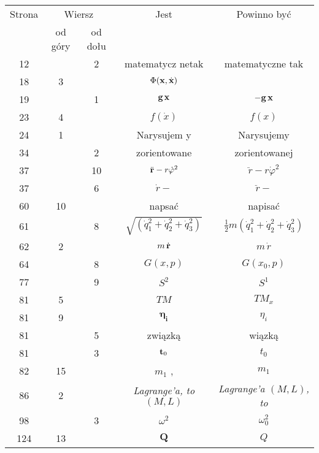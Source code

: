 \documentclass[a4paper,11pt]{article}
\numberwithin{equation}{section}
\begin{document}
\begin{center}

  \begin{tabular}{|c|c|c|c|c|}
    \hline
    Strona & \multicolumn{2}{c|}{Wiersz} & Jest
                              & Powinno być \\ \cline{2-3}
    & od góry & od dołu & & \\
    \hline
    12  & &  2 & matematycz netak & matematyczne tak \\
    18  &  3 & & $\Phi( \mathbf{x}, \dot{ \mathbf{x} } )$
    & %
    \\
    19  & &  1 & $\mathbf{g} \, \mathbf{x}$ & $-\mathbf{g} \, \mathbf{x}$ \\
    23  &  4 & & $f( \dot{ x } )$ & $f( x )$ \\
    24  &  1 & & Narysujem y & Narysujemy \\
    34  & &  2 & zorientowane & zorientowanej \\
    37  & & 10 & $\ddot{ \mathbf{r} } - r \dot{ \varphi }^{ 2 }$
           & $\ddot{ r } - r \dot{ \varphi }^{ 2 }$ \\
    37  & &  6 & $\dot{ r } -$ & $\ddot{ r } -$ \\
    60  & 10 & & napsać & napisać \\
    61  & &  8 & $\sqrt{ ( \dot{ q }_{ 1 }^{ 2 } + \dot{ q }_{ 2 }^{ 2 }
                 + \dot{ q }_{ 3 }^{ 2 } ) }$
           & $\frac{ 1 }{ 2 } m ( \dot{ q }_{ 1 }^{ 2 } + \dot{ q }_{ 2 }^{ 2 }
             + \dot{ q }_{ 3 }^{ 2 } )$ \\
    62  &  2 & & $m\, \dot{ \mathbf{r} }$ & $m\, \dot{ r }$ \\
    64  & &  8 & $G( x, p )$ & $G( x_{ 0 }, p )$ \\
    77  & &  9 & $S^{ 2 }$ & $S^{ 1 }$ \\
    81  &  5 & & $TM$ & $TM_{ x }$ \\
    81  &  9 & & $\mathbf{ \eta_{ i } }$ & $\eta_{ i }$ \\
    81  & &  5 & związką & wiązką \\
    81  & &  3 & $\mathbf{t}_{ 0 }$ & $t_{ 0 }$ \\
    82  & 15 & & $m_{ 1 }${  }, & $m_{ 1 }$ \\
    86  &  2 & & \textit{Lagrange’a, to $( M, L )$}
           & \textit{Lagrange’a $( M, L )$, to} \\
    98  & &  3 & $\omega^{ 2 }$ & $\omega_{ 0 }^{ 2 }$ \\
    124 & 13 & & $\mathbf{Q}$ & $Q$ \\

\end{tabular}
\end{center}
\end{document}
